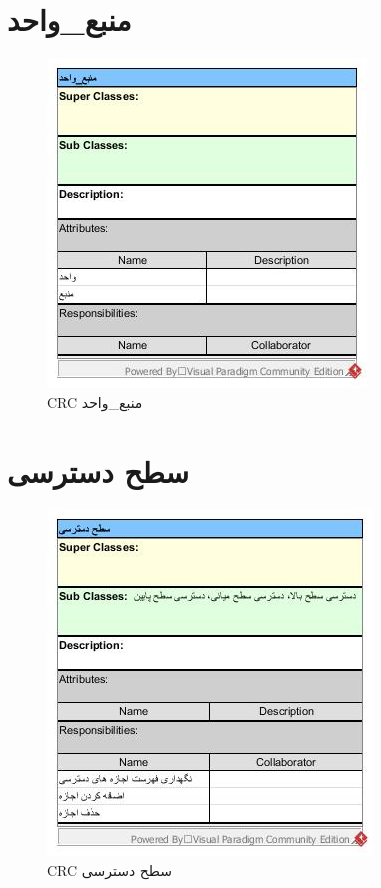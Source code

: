 \section{منبع\_واحد}
\begin{figure}[H]
	\centering
	\includegraphics[scale=1]{img/crc/UnitResource}
	\caption{CRC منبع\_واحد }
\end{figure}

\section{سطح دسترسی}
\begin{figure}[H]
	\centering
	\includegraphics[scale=1]{img/crc/AccessLevel}
	\caption{CRC سطح دسترسی }
\end{figure}

